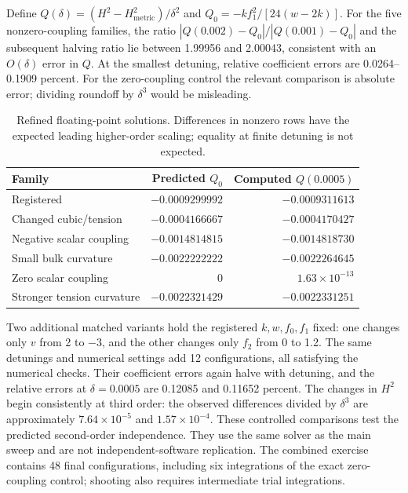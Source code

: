 \documentclass[11pt]{article}
\begin{document}
Define $Q(\delta)=(H^2-H_{\mathrm{metric}}^2)/\delta^2$ and $Q_0=-k f_1^2/[24(w-2k)]$. For the five nonzero-coupling families, the ratio $|Q(0.002)-Q_0|/|Q(0.001)-Q_0|$ and the subsequent halving ratio lie between 1.99956 and 2.00043, consistent with an $O(\delta)$ error in $Q$. At the smallest detuning, relative coefficient errors are 0.0264--0.1909 percent. For the zero-coupling control the relevant comparison is absolute error; dividing roundoff by $\delta^3$ would be misleading.

\begin{table}[ht]
\centering\small
\begin{tabular}{lrr}\toprule
Family & Predicted $Q_0$ & Computed $Q(0.0005)$\\\midrule
Registered & $-0.0009299992$ & $-0.0009311613$\\
Changed cubic/tension & $-0.0004166667$ & $-0.0004170427$\\
Negative scalar coupling & $-0.0014814815$ & $-0.0014818730$\\
Small bulk curvature & $-0.0022222222$ & $-0.0022264645$\\
Zero scalar coupling & $0$ & $1.63\times10^{-13}$\\
Stronger tension curvature & $-0.0022321429$ & $-0.0022331251$\\\bottomrule
\end{tabular}
\caption{Refined floating-point solutions. Differences in nonzero rows have the expected leading higher-order scaling; equality at finite detuning is not expected.}
\end{table}

Two additional matched variants hold the registered $k,w,f_0,f_1$ fixed: one changes only $v$ from 2 to $-3$, and the other changes only $f_2$ from 0 to 1.2. The same detunings and numerical settings add 12 configurations, all satisfying the numerical checks. Their coefficient errors again halve with detuning, and the relative errors at $\delta=0.0005$ are 0.12085 and 0.11652 percent. The changes in $H^2$ begin consistently at third order: the observed differences divided by $\delta^3$ are approximately $7.64\times10^{-5}$ and $1.57\times10^{-4}$. These controlled comparisons test the predicted second-order independence. They use the same solver as the main sweep and are not independent-software replication. The combined exercise contains 48 final configurations, including six integrations of the exact zero-coupling control; shooting also requires intermediate trial integrations.
\end{document}
